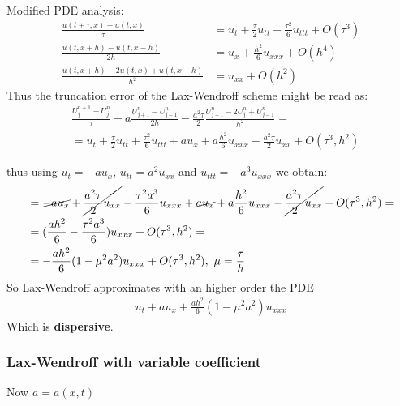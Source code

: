 \documentclass{beamer}
\begin{document}
\begin{frame}
Modified PDE analysis:
\begin{align*}
\frac{u(t+\tau,x) - u(t,x)}{\tau} & = u_t + \frac{\tau}{2}u_{tt} + \frac{\tau^2}{6}u_{ttt} + O(\tau^3) \\
\frac{u(t,x + h) - u(t,x-h)}{2h} & = u_x + \frac{h^2}{6}u_{xxx} + O(h^4) \\
\frac{u(t,x+h) - 2u(t,x) + u(t,x-h)}{h^2} & = u_{xx} + O(h^2)
\end{align*}
Thus the truncation error of the Lax-Wendroff scheme might be read as:
\begin{align*}
& \frac{U_j^{n+1} - U_j^n}{\tau} + a \frac{U_{j+1}^n -U_{j-1}^n}{2h} -\frac{a^2\tau}{2}\frac{U_{j+1}^n -2U_j^n+U_{j-1}^n}{h^2} = \\
& = u_t + \frac{\tau}{2}u_{tt} + \frac{\tau^2}{6}u_{ttt} + au_x + a\frac{h^2}{6}u_{xxx} - \frac{a^2\tau}{2} u_{xx} + O(\tau^3,h^2)
\end{align*}
\end{frame}
\begin{frame}
thus using $u_t = -au_x$, $u_{tt} = a^2u_{xx}$ and $u_{ttt} = -a^3u_{xxx}$ we obtain:
\begin{align*}
& = \cancel{-au_x} + \cancel{\frac{a^2\tau}{2}u_{xx}} -\frac{\tau^2a^3}{6}u_{xxx} + \cancel{au_x} + a\frac{h^2}{6}u_{xxx} - \cancel{\frac{a^2\tau}{2} u_{xx}} + O(\tau^3,h^2) = \\
& = (\frac{ah^2}{6} - \frac{\tau^2a^3}{6})u_{xxx} + O(\tau^3,h^2) = \\
& = -\frac{ah^2}{6}(1-\mu^2a^2)u_{xxx} + O(\tau^3,h^2), \ \mu = \frac{\tau}{h}
\end{align*}
So Lax-Wendroff approximates with an higher order the PDE
\begin{align*}
u_t + au_x +\frac{ah^2}{6}(1-\mu^2a^2)u_{xxx}
\end{align*}
Which is \textbf{dispersive}.
\end{frame}
\begin{frame}
\frametitle{Lax-Wendroff with variable coefficient}
Now $a = a(x,t)$
\end{frame}
\end{document}
